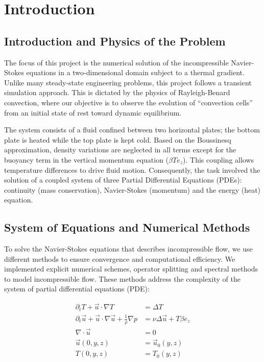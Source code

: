 \chapter{Introduction}

\section{Introduction and Physics of the Problem}


The focus of this project is the numerical solution of the incompressible Navier-Stokes equations in a two-dimensional domain subject to a thermal gradient. Unlike many steady-state engineering problems, this project follows a transient simulation approach. This is dictated by the physics of Rayleigh-Benard convection, where our objective is to observe the evolution of ``convection cells'' from an initial state of rest toward dynamic equilibrium.

The system consists of a fluid confined between two horizontal plates; the bottom plate is heated while the top plate is kept cold. Based on the Boussinesq approximation, density variations are neglected in all terms except for the buoyancy term in the vertical momentum equation ($\beta T e_z$). 
This coupling allows temperature differences to drive fluid motion. Consequently, the task involved the solution of a coupled system of three Partial Differential Equations (PDEs): continuity (mass conservation), Navier-Stokes (momentum) and the energy (heat) equation.

\section{System of Equations and Numerical Methods}
To solve the Navier-Stokes equations that describes incompressible flow, we use different methods to ensure convergence and computational efficiency.
We implemented explicit numerical schemes, operator splitting and spectral methods to model incompressible flow.
These methods address the complexity of the system of partial differential equations (PDE):

\begin{align}
\partial_t T + \vec u \cdot \nabla T &= \Delta T \\
\partial_t \vec u + \vec u \cdot \nabla \vec u + \frac{1}{\rho} \nabla p
&= \nu \Delta \vec u + T \beta e_z \\
\nabla \cdot \vec u &= 0 \\
\vec u(0,y,z) &= \vec u_0(y,z) \\
T(0,y,z) &= T_0(y,z)
\end{align}

